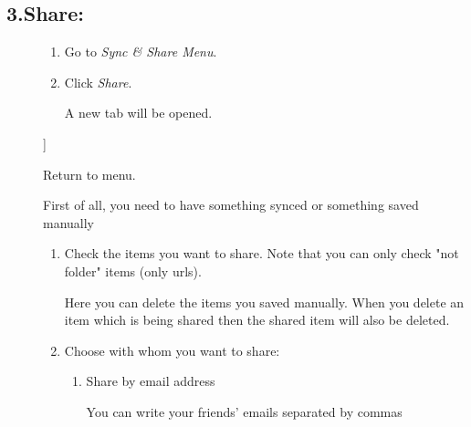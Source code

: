\documentclass{article}
\begin{document}
			
			
				
					\subsection*{ 3.Share:}
					
						\begin{description}
							\item[ 
								\textbf{\subsubsection*{
								 3.1.
								How to share?
								}
								}
							
							]
								\begin{enumerate}
									\item Go to \emph{Sync \& Share Menu}.
									\item Click \emph{Share}.
									\par A new tab will be opened.
									
								\end{enumerate}
							
							]
								
									Return to menu.
								
							
							\item[
								\textbf{\subsubsection*{
								 3.1.
								Sharing Options
								}
								}
							
							]
								\par 
									First of all, you need to have something synced
									or something saved manually
								
								\begin{enumerate}
									\item Check the items you want to share. Note that you can only check "not folder" items (only urls).
									\par 
										Here you can delete the 
										items you saved manually. 
										When you delete an item which is being shared then the shared item will also be deleted.
									
									
									\item Choose with whom you want to share:
										\begin{enumerate}
											\item Share by email address
												\par 
													You can write your friends' emails separated by commas
												

\end{enumerate}
\end{enumerate}
\end{description}
\end{document}
